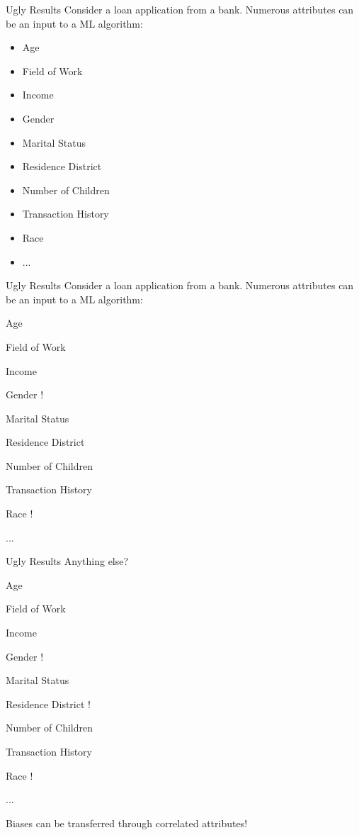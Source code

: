 \documentclass{beamer}
\begin{document}
\begin{frame}{Ugly Results}
Consider a loan application from a bank. Numerous attributes can be an input to a ML algorithm:
\begin{itemize}
\item{Age} 
\item{Field of Work} 
\item{Income} 
\item{Gender} 
\item{Marital Status}
\item{Residence District}
\item{Number of Children} 
\item{Transaction History} 
\item{Race}
\item{...} 
\end{itemize}
\end{frame}

\begin{frame}{Ugly Results}
Consider a loan application from a bank. Numerous attributes can be an input to a ML algorithm:
\begin{itemize}
\item{Age} 
\item{Field of Work} 
\item{Income} 
{\color{red}\item{Gender !} }
\item{Marital Status}
\item{Residence District}
\item{Number of Children} 
\item{Transaction History} 
{\color{red}\item{Race !}}
\item{...} 
\end{itemize}
\end{frame}

\begin{frame}{Ugly Results}
Anything else? \pause 
\begin{itemize}
\item{Age} 
\item{Field of Work} 
\item{Income} 
{\color{red}\item{Gender !} }
\item{Marital Status}
{\color{red}\item{Residence District !} }
\item{Number of Children} 
\item{Transaction History} 
{\color{red}\item{Race !}}
\item{...} 
\end{itemize}
\begin{block}{ }
Biases can be transferred through correlated attributes!
\end{block}
\end{frame}
\end{document}
